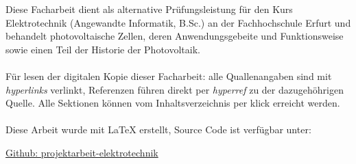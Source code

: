 Diese Facharbeit dient als alternative Prüfungsleistung für den
Kurs Elektrotechnik (Angewandte Informatik, B.Sc.) an der
Fachhochschule Erfurt und behandelt photovoltaische Zellen, deren
Anwendungsgebeite und Funktionsweise sowie einen Teil der
Historie der Photovoltaik.
\\\\
Für lesen der digitalen Kopie dieser Facharbeit: alle
Quallenangaben sind mit \textit{hyperlinks} verlinkt, Referenzen
führen direkt per \textit{hyperref} zu der dazugehöhrigen Quelle.
Alle Sektionen können vom Inhaltsverzeichnis per klick erreicht
werden.
\\\\
Diese Arbeit wurde mit \LaTeX{} erstellt, Source Code ist verfügbar unter:
\begin{center}
    \hyperlink{https://github.com/erxkk/projektarbeit-elektrotechnik}
    {Github: projektarbeit-elektrotechnik}
\end{center}
